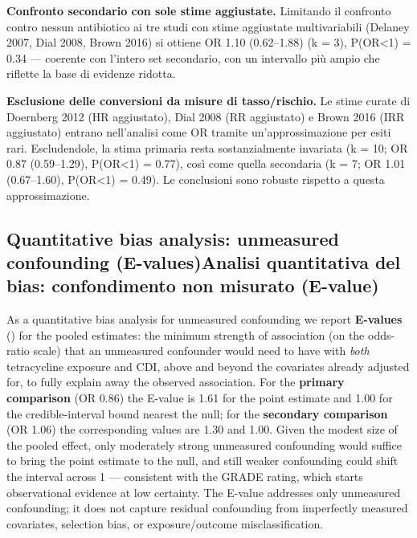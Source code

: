 \documentclass[
  letterpaper,
  DIV=11,
  numbers=noendperiod]{scrartcl}
\begin{document}
\textbf{Confronto secondario con sole stime aggiustate.} Limitando il
confronto contro nessun antibiotico ai tre studi con stime aggiustate
multivariabili (Delaney 2007, Dial 2008, Brown 2016) si ottiene OR 1.10
(0.62--1.88) (k = 3), P(OR\textless1) = 0.34 --- coerente con l'intero
set secondario, con un intervallo più ampio che riflette la base di
evidenze ridotta.

\textbf{Esclusione delle conversioni da misure di tasso/rischio.} Le
stime curate di Doernberg 2012 (HR aggiustato), Dial 2008 (RR
aggiustato) e Brown 2016 (IRR aggiustato) entrano nell'analisi come OR
tramite un'approssimazione per esiti rari. Escludendole, la stima
primaria resta sostanzialmente invariata (k = 10; OR 0.87 (0.59--1.29),
P(OR\textless1) = 0.77), così come quella secondaria (k = 7; OR 1.01
(0.67--1.60), P(OR\textless1) = 0.49). Le conclusioni sono robuste
rispetto a questa approssimazione.

\subsection{\texorpdfstring{{Quantitative bias analysis: unmeasured
confounding (E-values)}{Analisi quantitativa del bias: confondimento non
misurato
(E-value)}}{Quantitative bias analysis: unmeasured confounding (E-values)Analisi quantitativa del bias: confondimento non misurato (E-value)}}\label{quantitative-bias-analysis-unmeasured-confounding-e-valuesanalisi-quantitativa-del-bias-confondimento-non-misurato-e-value}

As a quantitative bias analysis for unmeasured confounding we report
\textbf{E-values} () for the pooled estimates: the minimum strength of
association (on the odds-ratio scale) that an unmeasured confounder
would need to have with \emph{both} tetracycline exposure and CDI, above
and beyond the covariates already adjusted for, to fully explain away
the observed association. For the \textbf{primary comparison} (OR 0.86)
the E-value is 1.61 for the point estimate and 1.00 for the
credible-interval bound nearest the null; for the \textbf{secondary
comparison} (OR 1.06) the corresponding values are 1.30 and 1.00. Given
the modest size of the pooled effect, only moderately strong unmeasured
confounding would suffice to bring the point estimate to the null, and
still weaker confounding could shift the interval across 1 ---
consistent with the GRADE rating, which starts observational evidence at
low certainty. The E-value addresses only unmeasured confounding; it
does not capture residual confounding from imperfectly measured
covariates, selection bias, or exposure/outcome misclassification.
\end{document}
